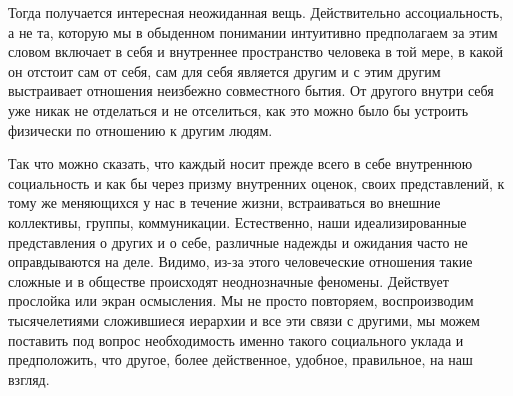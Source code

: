 Тогда получается интересная неожиданная вещь. Действительно ассоциальность,
а не та, которую мы в обыденном понимании интуитивно предполагаем за этим словом
включает в себя и внутреннее пространство человека в той мере, в какой он
отстоит сам от себя, сам для себя является другим и с этим другим выстраивает
отношения неизбежно совместного бытия. От другого внутри себя уже никак не
отделаться и не отселиться, как это можно было бы устроить физически по
отношению к другим людям. 


Так что
можно сказать, что каждый носит прежде всего в себе внутреннюю социальность и
как бы через призму внутренних оценок, своих представлений, к тому же меняющихся
у нас в течение жизни, встраиваться во внешние коллективы, группы, коммуникации.
Естественно, наши идеализированные представления о других и о себе, различные
надежды и ожидания часто не оправдываются на деле. Видимо, из-за этого
человеческие отношения такие сложные и в обществе происходят неоднозначные
феномены. Действует прослойка или экран осмысления. Мы не просто повторяем,
воспроизводим тысячелетиями сложившиеся иерархии и все эти связи с другими, мы
можем поставить под вопрос необходимость именно такого социального уклада и
предположить, что другое, более действенное, удобное, правильное, на наш взгляд.

